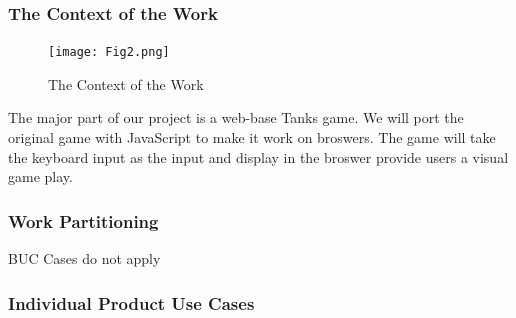 \documentclass[12pt, titlepage]{article}
\begin{document}
\subsubsection{The Context of the Work}
\begin{figure}[hp]
\texttt{[image: Fig2.png]}
\caption{The Context of the Work} \label{fig:Fig2.png}
\end{figure}
The major part of our project is a web-base Tanks game. We will port the original
game with JavaScript to make it work on broswers. The game will take the keyboard
input as the input and display in the broswer provide users a visual game play.
\subsubsection{Work Partitioning}
BUC Cases do not apply
\subsubsection{Individual Product Use Cases}
\end{document}
